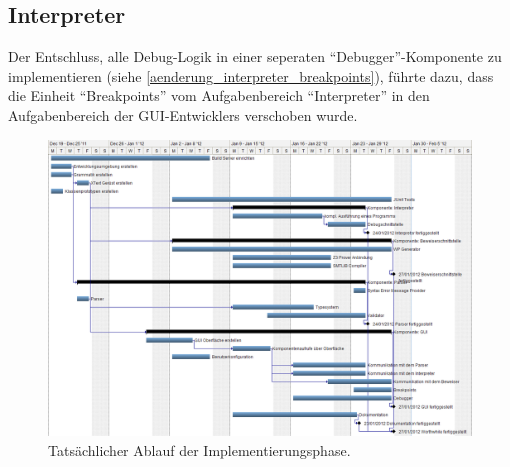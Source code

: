 \subsection{Interpreter}
Der Entschluss, alle Debug-Logik in einer seperaten "`Debugger"'-Komponente zu implementieren (siehe \ref{aenderung_interpreter_breakpoints}), führte dazu, dass die Einheit "`Breakpoints"' vom Aufgabenbereich "`Interpreter"' in den Aufgabenbereich der GUI-Entwicklers verschoben wurde.

\begin{landscape}%
	\begin{figure}%
		\vspace{-2cm}
		\includegraphics[height=1.2\textheight]{images/gantt_implementierung_diag.png}%
		\caption{Tatsächlicher Ablauf der Implementierungsphase.}%
	\end{figure}%
\end{landscape}
